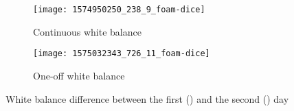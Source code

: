 \begin{figure}[h]
  \centering
  \begin{subfigure}[b]{0.45\textwidth}
    \centering
    \texttt{[image: 1574950250\_238\_9\_foam-dice]}
    \caption{Continuous white balance}
    \label{subfig:foam_dice_first_day}
  \end{subfigure}
  \begin{subfigure}[b]{0.45\textwidth}
    \centering
    \texttt{[image: 1575032343\_726\_11\_foam-dice]}
    \caption{One-off white balance}
    \label{subfig:foam_dice_second_day}
  \end{subfigure}
  \caption{White balance difference between the first () and the second () day}
  \label{fig:dataset_white_balance}
\end{figure}

